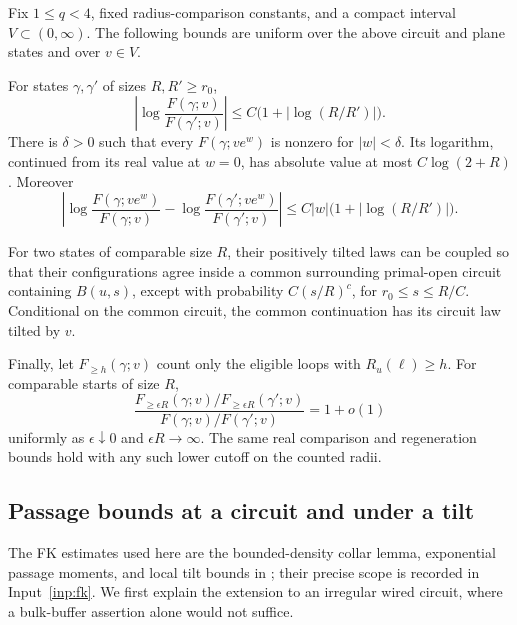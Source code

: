 \begin{proposition}\label{prop:radial}
Fix $1\le q<4$, fixed radius-comparison constants, and a compact interval
$V\subset(0,\infty)$. The following bounds are uniform over the above
circuit and plane states and over $v\in V$.

For states $\gamma,\gamma'$ of sizes $R,R'\ge r_0$,
\begin{equation}\label{eq:radial-comparison}
 \left|\log\frac{F(\gamma;v)}{F(\gamma';v)}\right|
       \le C\bigl(1+|\log(R/R')|\bigr).
\end{equation}
There is $\delta>0$ such that every $F(\gamma;ve^w)$ is nonzero for
$|w|<\delta$. Its logarithm, continued from its real value at $w=0$,
has absolute value at most $C\log(2+R)$. Moreover
\begin{equation}\label{eq:radial-complex-ratio}
 \left|\log\frac{F(\gamma;ve^w)}{F(\gamma;v)}
       -\log\frac{F(\gamma';ve^w)}{F(\gamma';v)}\right|
 \le C|w|\bigl(1+|\log(R/R')|\bigr).
\end{equation}

For two states of comparable size $R$, their positively tilted laws
can be coupled so that their configurations agree inside a common
surrounding primal-open circuit containing $B(u,s)$, except with
probability $C(s/R)^c$, for $r_0\le s\le R/C$. Conditional on the common
circuit, the common continuation has its circuit law tilted by $v$.

Finally, let $F_{\ge h}(\gamma;v)$ count only the eligible loops with
$R_u(\ell)\ge h$. For comparable starts of size $R$,
\begin{equation}\label{eq:radial-truncation}
 \frac{F_{\ge\epsilon R}(\gamma;v)/
             F_{\ge\epsilon R}(\gamma';v)}
      {F(\gamma;v)/F(\gamma';v)}=1+o(1)
\end{equation}
uniformly as $\epsilon\downarrow0$ and $\epsilon R\to\infty$.
The same real comparison and regeneration bounds hold with any such
lower cutoff on the counted radii.
\end{proposition}

\subsection{Passage bounds at a circuit and under a tilt}

The FK estimates used here are the bounded-density collar lemma,
exponential passage moments, and local tilt bounds in
\cite[Section~2, ``Comparison through a collar'' and ``Passages and
positive local tilts'']{FKCompanion}; their precise scope is recorded
in Input~\ref{inp:fk}. We first explain the extension to an irregular
wired circuit, where a bulk-buffer assertion alone would not suffice.

